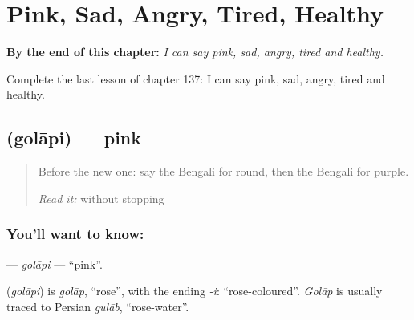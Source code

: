 
\chapter{Pink, Sad, Angry, Tired, Healthy}
\label{ch:bn-pink-sad-angry-tired-healthy}

\begin{chapteropening}
\textbf{By the end of this chapter:} \emph{I can say pink, sad, angry, tired and healthy.}

Complete the last lesson of chapter 137: I can say pink, sad, angry, tired and healthy.
\end{chapteropening}

\section[\texorpdfstring{\bn{গোলাপি} (golāpi)}{গোলাপি (golāpi)}]{ (golāpi) — pink}

\label{lesson:BN-C137-golapi}



\begin{quote}
Before the new one: say the Bengali for round, then the Bengali for purple.

\emph{Read it:} \textbf{       } without stopping
\end{quote}

\subsection*{You'll want to know: }
\textbf{} — \emph{golāpi} — \textquotedblleft{}pink\textquotedblright{}.

\begin{cousinweb}
\textbf{} (\emph{golāpi}) is \emph{golāp}, \textquotedblleft{}rose\textquotedblright{}, with the ending \emph{-i}: \textquotedblleft{}rose-coloured\textquotedblright{}. \emph{Golāp} is usually traced to Persian \emph{gulāb}, \textquotedblleft{}rose-water\textquotedblright{}.
\end{cousinweb}

